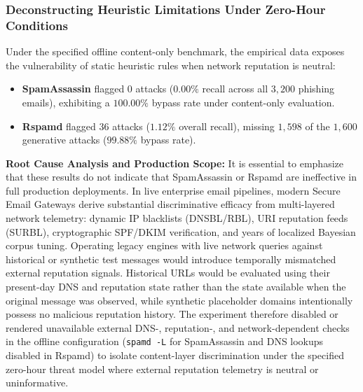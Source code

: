 \documentclass[journal]{IEEEtran}
\begin{document}
\subsubsection{Deconstructing Heuristic Limitations Under Zero-Hour Conditions}
Under the specified offline content-only benchmark, the empirical data exposes the vulnerability of static heuristic rules when network reputation is neutral:
\begin{itemize}
    \item \textbf{SpamAssassin} flagged 0 attacks ($0.00\%$ recall across all $3,200$ phishing emails), exhibiting a $100.00\%$ bypass rate under content-only evaluation.
    \item \textbf{Rspamd} flagged $36$ attacks ($1.12\%$ overall recall), missing $1,598$ of the $1,600$ generative attacks ($99.88\%$ bypass rate).
\end{itemize}
\textbf{Root Cause Analysis and Production Scope:} It is essential to emphasize that these results do not indicate that SpamAssassin or Rspamd are ineffective in full production deployments. In live enterprise email pipelines, modern Secure Email Gateways derive substantial discriminative efficacy from multi-layered network telemetry: dynamic IP blacklists (DNSBL/RBL), URI reputation feeds (SURBL), cryptographic SPF/DKIM verification, and years of localized Bayesian corpus tuning. Operating legacy engines with live network queries against historical or synthetic test messages would introduce temporally mismatched external reputation signals. Historical URLs would be evaluated using their present-day DNS and reputation state rather than the state available when the original message was observed, while synthetic placeholder domains intentionally possess no malicious reputation history. The experiment therefore disabled or rendered unavailable external DNS-, reputation-, and network-dependent checks in the offline configuration (\texttt{spamd -L} for SpamAssassin and DNS lookups disabled in Rspamd) to isolate content-layer discrimination under the specified zero-hour threat model where external reputation telemetry is neutral or uninformative.
\end{document}
